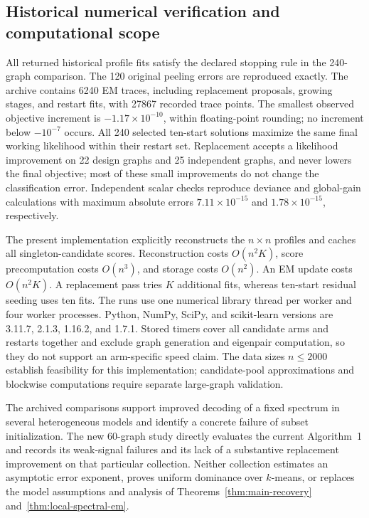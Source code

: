 \documentclass[11pt]{article}
\theoremstyle{definition}
\theoremstyle{remark}
\numberwithin{equation}{section}
\begin{document}
\subsection{Historical numerical verification and computational scope}

All returned historical profile fits satisfy the declared stopping rule in the 240-graph
comparison. The 120 original peeling errors are reproduced exactly. The
archive contains 6240 EM traces, including replacement proposals, growing
stages, and restart fits, with 27867 recorded trace points. The smallest
observed objective increment is $-1.17\times10^{-10}$, within floating-point
rounding; no increment below $-10^{-7}$ occurs. All 240 selected ten-start
solutions maximize the same final working likelihood within their restart
set. Replacement accepts a likelihood improvement on 22 design graphs and
25 independent graphs, and never lowers the final objective; most of these
small improvements do not change the classification error. Independent
scalar checks reproduce deviance and global-gain calculations with maximum
absolute errors $7.11\times10^{-15}$ and $1.78\times10^{-15}$, respectively.

The present implementation explicitly reconstructs the $n\times n$ profiles
and caches all singleton-candidate scores. Reconstruction costs
$O(n^2K)$, score precomputation costs $O(n^3)$, and storage costs $O(n^2)$.
An EM update costs $O(n^2K)$. A replacement pass tries $K$ additional fits,
whereas ten-start residual seeding uses ten fits. The runs use one numerical
library thread per worker and four worker processes. Python, NumPy, SciPy,
and scikit-learn versions are 3.11.7, 2.1.3, 1.16.2, and 1.7.1. Stored timers
cover all candidate arms and restarts together and exclude graph generation
and eigenpair computation, so they do not support an arm-specific speed
claim. The data sizes $n\le2000$ establish feasibility for this implementation;
candidate-pool approximations and blockwise computations require separate
large-graph validation.

The archived comparisons support improved decoding of a fixed spectrum in
several heterogeneous models and identify a concrete failure of subset
initialization. The new 60-graph study directly evaluates the current
Algorithm~1 and records its weak-signal failures and its lack of a substantive
replacement improvement on that particular collection. Neither collection
estimates an asymptotic error exponent, proves uniform dominance over
$k$-means, or replaces the model assumptions and analysis of
Theorems~\ref{thm:main-recovery} and~\ref{thm:local-spectral-em}.
\end{document}
